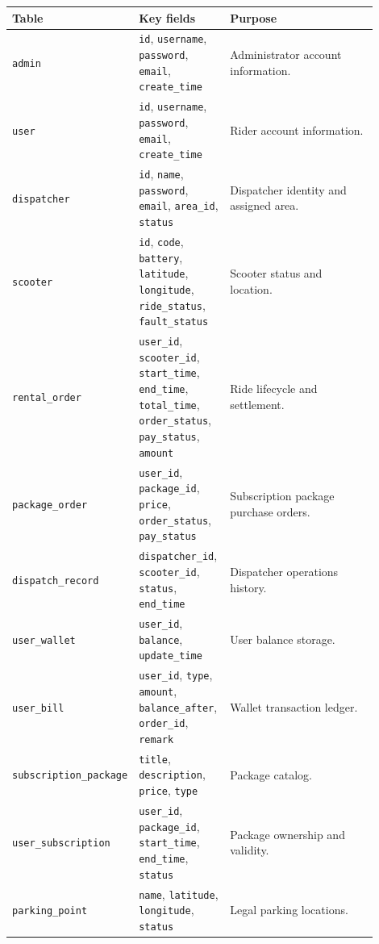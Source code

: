 \documentclass[12pt,a4paper]{article}
\begin{document}
\begin{longtable}{>{\raggedright\arraybackslash}p{0.22\linewidth}>{\raggedright\arraybackslash}p{0.25\linewidth}>{\raggedright\arraybackslash}p{0.43\linewidth}}
\toprule
\textbf{Table} & \textbf{Key fields} & \textbf{Purpose} \\
\midrule
\endhead
\texttt{admin} & \texttt{id}, \texttt{username}, \texttt{password}, \texttt{email}, \texttt{create\_time} & Administrator account information. \\
\texttt{user} & \texttt{id}, \texttt{username}, \texttt{password}, \texttt{email}, \texttt{create\_time} & Rider account information. \\
\texttt{dispatcher} & \texttt{id}, \texttt{name}, \texttt{password}, \texttt{email}, \texttt{area\_id}, \texttt{status} & Dispatcher identity and assigned area. \\
\texttt{scooter} & \texttt{id}, \texttt{code}, \texttt{battery}, \texttt{latitude}, \texttt{longitude}, \texttt{ride\_status}, \texttt{fault\_status} & Scooter status and location. \\
\texttt{rental\_order} & \texttt{user\_id}, \texttt{scooter\_id}, \texttt{start\_time}, \texttt{end\_time}, \texttt{total\_time}, \texttt{order\_status}, \texttt{pay\_status}, \texttt{amount} & Ride lifecycle and settlement. \\
\texttt{package\_order} & \texttt{user\_id}, \texttt{package\_id}, \texttt{price}, \texttt{order\_status}, \texttt{pay\_status} & Subscription package purchase orders. \\
\texttt{dispatch\_record} & \texttt{dispatcher\_id}, \texttt{scooter\_id}, \texttt{status}, \texttt{end\_time} & Dispatcher operations history. \\
\texttt{user\_wallet} & \texttt{user\_id}, \texttt{balance}, \texttt{update\_time} & User balance storage. \\
\texttt{user\_bill} & \texttt{user\_id}, \texttt{type}, \texttt{amount}, \texttt{balance\_after}, \texttt{order\_id}, \texttt{remark} & Wallet transaction ledger. \\
\texttt{subscription\_package} & \texttt{title}, \texttt{description}, \texttt{price}, \texttt{type} & Package catalog. \\
\texttt{user\_subscription} & \texttt{user\_id}, \texttt{package\_id}, \texttt{start\_time}, \texttt{end\_time}, \texttt{status} & Package ownership and validity. \\
\texttt{parking\_point} & \texttt{name}, \texttt{latitude}, \texttt{longitude}, \texttt{status} & Legal parking locations. \\

\end{longtable}
\end{document}

